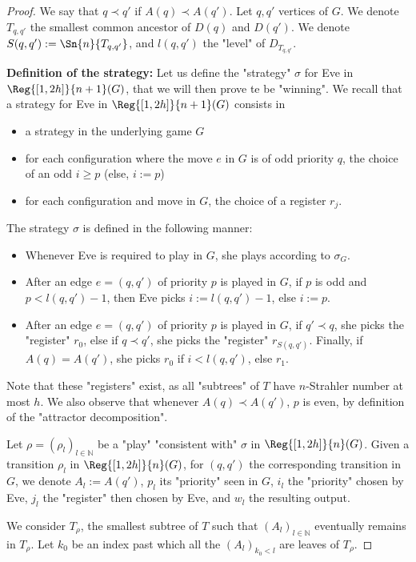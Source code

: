 \documentclass[a4paper,UKenglish,cleveref, autoref, thm-restate]{lipics-v2021}
\newcommand{\NN}{\mathbb{N}}
\renewcommand{\geq}{\geqslant}
\begin{document}
\begin{proof}
	We say that $q \prec q'$ if $A(q) \prec A(q')$.
	Let $q,q'$ vertices of $G$. We denote $T_{q,q'}$ the smallest common ancestor of $D(q)$ and $D(q')$. We denote $S(q,q') := \Sn{n}{T_{q,q'}}$, and $l(q,q')$ the "level" of $D_{T_{q,q'}}$.
	
	\textbf{Definition of the strategy:} Let us define the "strategy" $\sigma$ for Eve in $\Reg{[1,2h]}{n+1}(G)$, that we will then prove te be "winning". We recall that a strategy for Eve in $\Reg{[1,2h]}{n+1}(G)$ consists in \begin{itemize}
		\item a strategy in the underlying game $G$
		\item for each configuration where the move $e$ in $G$ is of odd priority $q$, the choice of an odd $i\geq p$ (else, $i:= p$)
		\item for each configuration and move in $G$, the choice of a register $r_j$.
	\end{itemize}
	The strategy $\sigma$ is defined in the following manner:
	\begin{itemize}
		\item Whenever Eve is required to play in $G$, she plays according to $\sigma_G$.
		\item After an edge $e = (q,q')$ of priority $p$ is played in $G$, if $p$ is odd and $p<l(q,q')-1$, then Eve picks $i := l(q,q')-1$, else $i := p$.
		\item After an edge $e = (q,q')$ of priority $p$ is played in $G$, if $q' \prec q$, she picks the "register" $r_0$, else if $q \prec q'$, she picks the "register" $r_{S(q,q')}$. Finally, if $A(q) = A(q')$, she picks $r_0$ if $i<l(q,q')$, else $r_1$. 
	\end{itemize} Note that these "registers" exist, as all "subtrees" of $T$ have $n$-Strahler number at most $h$. We also observe that whenever $A(q)\prec A(q')$, $p$ is even, by definition of the "attractor decomposition".
	
	Let $\rho = (\rho_l)_{l\in \NN}$ be a "play" "consistent with" $\sigma$ in $\Reg{[1,2h]}{n}(G)$. Given a transition $\rho_l$ in $\Reg{[1,2h]}{n}(G)$, for $(q,q')$ the corresponding transition in $G$, we denote $A_l := A(q')$, $p_l$ its "priority" seen in $G$, $i_l$ the "priority" chosen by Eve, $j_l$ the "register" then chosen by Eve, and $w_l$ the resulting output.
	
	We consider $T_{\rho}$, the smallest subtree of $T$ such that $(A_l)_{l\in \NN}$ eventually remains in $T_\rho$. Let $k_0$ be an index past which all the $(A_l)_{k_0<l}$ are leaves of $T_\rho$.
	

\end{proof}
\end{document}
